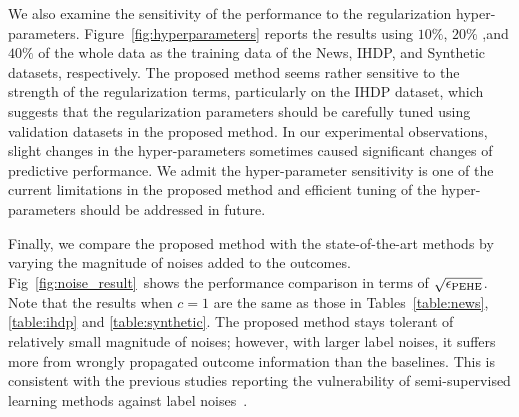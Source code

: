 We also examine the sensitivity of the performance to the regularization hyper-parameters.
Figure~\ref{fig:hyperparameters} reports the results using $10\%$, $20\%$ ,and $40\%$ of the whole data as the training data of the News, IHDP, and Synthetic datasets, respectively. 
The proposed method seems rather sensitive to the strength of the regularization terms, particularly on the IHDP dataset, which suggests that the regularization parameters should be carefully tuned using validation datasets in the proposed method. 
In our experimental observations, slight changes in the hyper-parameters sometimes caused significant changes of predictive performance. 
We admit the hyper-parameter sensitivity is one of the current limitations in the proposed method and  efficient tuning of the hyper-parameters should be addressed in future.

Finally, we compare the proposed method with the state-of-the-art methods by varying the magnitude of noises added to the outcomes. 
Fig~\ref{fig:noise_result}~shows the performance comparison in terms of $\rm \sqrt{\epsilon_{PEHE}}$.
Note that the results when $c=1$ are the same as those in Tables~\ref{table:news}, \ref{table:ihdp} and \ref{table:synthetic}.
The proposed method stays tolerant of relatively small magnitude of noises; however, with larger label noises, it suffers more from wrongly propagated outcome information than the baselines. 
This is consistent with the previous studies reporting the vulnerability of semi-supervised learning methods against label noises~\cite{vahdat2017toward,bui2018neural,du2018robust,liu2012robust}. 

